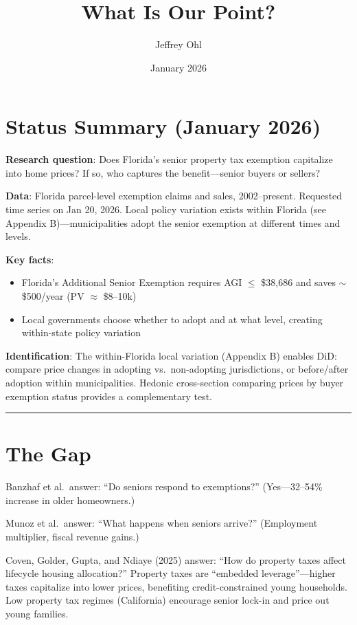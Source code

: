 \documentclass[11pt]{article}
\title{What Is Our Point?}
\author{Jeffrey Ohl}
\date{January 2026}
\begin{document}
\maketitle

\section*{Status Summary (January 2026)}

\textbf{Research question}: Does Florida's senior property tax exemption capitalize into home prices? If so, who captures the benefit---senior buyers or sellers?

\textbf{Data}: Florida parcel-level exemption claims and sales, 2002--present. Requested time series on Jan 20, 2026. Local policy variation exists within Florida (see Appendix B)---municipalities adopt the senior exemption at different times and levels.

\textbf{Key facts}:
\begin{itemize}
    \item Florida's Additional Senior Exemption requires AGI $\leq$ \$38,686 and saves $\sim$\$500/year (PV $\approx$ \$8--10k)
    \item Local governments choose whether to adopt and at what level, creating within-state policy variation
\end{itemize}

\textbf{Identification}: The within-Florida local variation (Appendix B) enables DiD: compare price changes in adopting vs.\ non-adopting jurisdictions, or before/after adoption within municipalities. Hedonic cross-section comparing prices by buyer exemption status provides a complementary test.

\vspace{1em}
\hrule
\vspace{1em}

\section{The Gap}

Banzhaf et al.\ answer: ``Do seniors respond to exemptions?'' (Yes---32--54\% increase in older homeowners.)

Munoz et al.\ answer: ``What happens when seniors arrive?'' (Employment multiplier, fiscal revenue gains.)

Coven, Golder, Gupta, and Ndiaye (2025) answer: ``How do property taxes affect lifecycle housing allocation?'' Property taxes are ``embedded leverage''---higher taxes capitalize into lower prices, benefiting credit-constrained young households. Low property tax regimes (California) encourage senior lock-in and price out young families.
\end{document}

